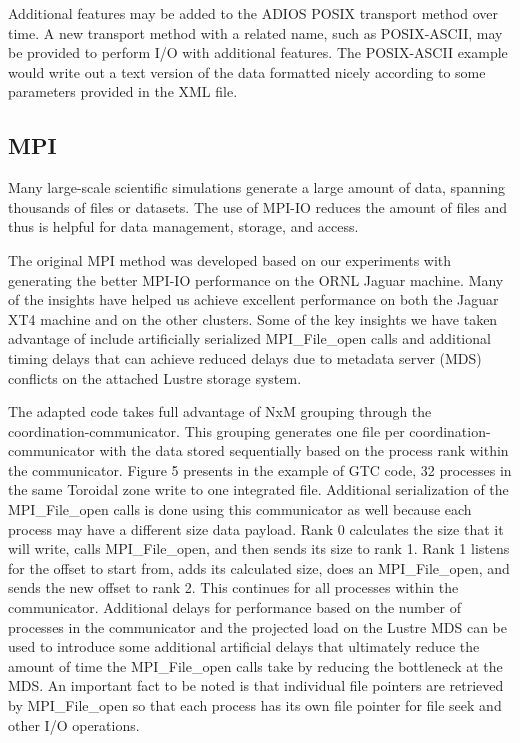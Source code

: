 Additional features may be added to the ADIOS POSIX transport method over time. 
A new transport method with a related name, such as POSIX-ASCII, may be provided 
to perform I/O with additional features. The POSIX-ASCII example would write out 
a text version of the data formatted nicely according to some parameters provided 
in the XML file.\label{HToc84890259}\label{HToc212016635}\label{HToc212016877}\label{HToc182553383}

\subsection{MPI}

Many large-scale scientific simulations generate a large amount of data, spanning 
thousands of files or datasets. The use of MPI-IO reduces the amount of files and 
thus is helpful for data management, storage, and access. 

The original MPI method was developed based on our experiments with generating 
the better MPI-IO performance on the ORNL Jaguar machine. Many of the insights 
have helped us achieve excellent performance on both the Jaguar XT4 machine and 
on the other clusters. Some of the key insights we have taken advantage of include 
artificially serialized MPI\_File\_open calls and additional timing delays that 
can achieve reduced delays due to metadata server (MDS) conflicts on the attached 
Lustre storage system.

The adapted code takes full advantage of NxM grouping through the coordination-communicator. 
This grouping generates one file per coordination-communicator with the data stored 
sequentially based on the process rank within the communicator.  Figure 5 presents 
in the example of GTC code, 32 processes in the same Toroidal zone write to one 
integrated file. Additional serialization of the MPI\_File\_open calls is done 
using this communicator as well because each process may have a different size 
data payload. Rank 0 calculates the size that it will write, calls MPI\_File\_open, 
and then sends its size to rank 1. Rank 1 listens for the offset to start from, 
adds its calculated size, does an MPI\_File\_open, and sends the new offset to 
rank 2. This continues for all processes within the communicator. Additional delays 
for performance based on the number of processes in the communicator and the projected 
load on the Lustre MDS can be used to introduce some additional artificial delays 
that ultimately reduce the amount of time the MPI\_File\_open calls take by reducing 
the bottleneck at the MDS. An important fact to be noted is that individual file 
pointers are retrieved by MPI\_File\_open so that each process has its own file 
pointer for file seek and other I/O operations.

